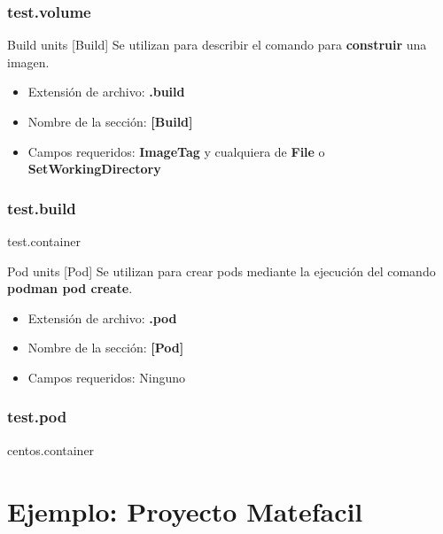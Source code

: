 \begin{frame}[fragile]
  \frametitle{test.volume}
  
\end{frame}

\begin{frame}[c]{Build units [Build]}
  Se utilizan para describir el comando para \textbf{construir}
  una imagen.
  \begin{itemize}
    \item Extensión de archivo: \textbf{.build}
    \item Nombre de la sección: \textbf{[Build]}
    \item Campos requeridos: \textbf{ImageTag} y cualquiera de
      \textbf{File} o \textbf{SetWorkingDirectory}
  \end{itemize}
\end{frame}

\begin{frame}[fragile]
  \frametitle{test.build}
  
  test.container
  
\end{frame}

\begin{frame}[c]{Pod units [Pod]}
  Se utilizan para crear pods mediante la ejecución del
  comando \textbf{podman pod create}.
  \begin{itemize}
    \item Extensión de archivo: \textbf{.pod}
    \item Nombre de la sección: \textbf{[Pod]}
    \item Campos requeridos: Ninguno
  \end{itemize}
\end{frame}

\begin{frame}[fragile]
  \frametitle{test.pod}
  
  centos.container
  
\end{frame}

\section{Ejemplo: Proyecto Matefacil}

